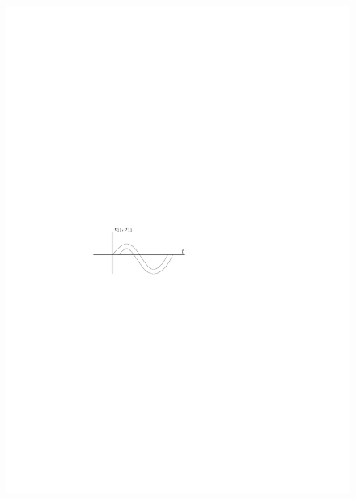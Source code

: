 \documentclass[a4paper, 12pt, brazilian]{article}
\begin{document}
\begin{itemize}
		\begin{figure}[H]
			\centering
			\includegraphics[scale=1.3]{images/elast}
			\hspace{1cm}

\end{figure}
\end{itemize}
\end{document}
